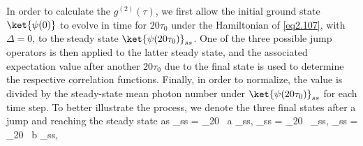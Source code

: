 In order to calculate the $g^{(2)}(\tau)$, we first allow the initial ground state $\ket{\psi(0)}$ to evolve in time for $20\tau_0$ under the Hamiltonian of \eqref{eq2.107}, with $\Delta = 0$, to the steady state $\ket{\psi(20\tau_0)}_{ss}$. One of the three possible jump operators is then applied to the latter steady state, and the associated expectation value after another $20\tau_0$ due to the final state is used to determine the respective correlation functions. Finally, in order to normalize, the value is divided by the steady-state mean photon number under $\ket{\psi(20\tau_0)}_{ss}$ for each time step. To better illustrate the process, we denote the three final states after a jump and reaching the steady state as
%
\be {}_{ss} = \hat{\Upsilon}_{20} \, a _{ss}, \quad \ket{\psi_{\gamma}}_{ss} = \hat{\Upsilon}_{20} \, \sminus {}_{ss}, \quad {}_{ss} = \hat{\Upsilon}_{20} \, b _{ss}, \label{eq4.9} \ee
%
\newpage
